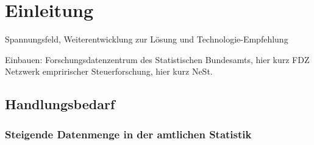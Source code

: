 \documentclass[
  german,
  10pt,
  twoside]{article}
\makeatletter
\newcommand{\berlintime}{%
  \berlinhr=\time\relax
  \divide\berlinhr by 60\relax
  \berlinmin=\time\relax
  \multiply\berlinhr by -60\relax
  \advance\berlinmin by \berlinhr\relax
  \berlinhr=\time\relax
  \divide\berlinhr by 60\relax
  \advance\berlinhr by 1\relax
  \ifnum\berlinhr>23\relax
    \advance\berlinhr by -24\relax
  \fi
  \ifnum\berlinhr<10 0\fi\the\berlinhr:\ifnum\berlinmin<10 0\fi\the\berlinmin%
}
\newif\ifdraftmode
\providecommand{\totalchars}{0}
\providecommand{\totalwords}{0}
\providecommand{\abstractchars}{0}
\providecommand{\abstractwords}{0}
\providecommand{\zusammenfassungchars}{0}
\providecommand{\zusammenfassungwords}{0}
\providecommand{\footnotecountnum}{0}
\providecommand{\citationcountnum}{0}
\newcommand{\doctitle}{$title$}
\newcommand{\docauthors}{$author-short$}
\newcommand{\docpublication}{$publication$}
\newcommand{\docpublicationissue}{$publication-issue$}
\newcommand{\metadatapage}{%
  \clearpage
  \thispagestyle{empty}
  \onecolumn
  \vspace*{1.5cm}
  
  {\raggedright
  {\LARGE\bfseries\color{wistaBlue} Dokument-Metadaten}\\[0.5cm]
  
  \begin{tabular}{@{}ll}
    \textbf{Titel:} & \doctitle \\[0.3em]
    \textbf{Autoren:} & \docauthors \\[0.3em]
    \textbf{Veröffentlichung:} & \docpublication\ \docpublicationissue \\[0.3em]
    \textbf{Erstellungsdatum:} & \today\ um \berlintime\ Uhr \\[0.3em]
  \end{tabular}
  
  \vspace{0.5cm}
  {\color{wistaBlue}\rule{\textwidth}{1pt}}
  \par}
  
  \vspace{1cm}
  
  {\large\bfseries\color{wistaDarkGray} Dokumentstatistik}\\[0.5cm]
  
  \small
  \begin{tabular}{@{}lrrrrrr@{}}
    \toprule
    \textbf{Abschnitt} & \textbf{Wörter} & \textbf{Zeichen} & \textbf{Fußn.} & \textbf{Quellen} & \textbf{Vorgabe} \\
    \midrule
    Insgesamt & \textcolor{wistaBlue}{\textbf{\totalwords}} & \textcolor{wistaBlue}{\textbf{\totalchars}} & \textcolor{wistaBlue}{\textbf{\footnotecountnum}} & \textcolor{wistaBlue}{\textbf{\citationcountnum}} & 30\,000 Z. \\
    Zusammenfassung & \textcolor{wistaBlue}{\textbf{\zusammenfassungwords}} & \textcolor{wistaBlue}{\textbf{\zusammenfassungchars}} & --- & --- & 800 Z. \\
    Abstract & \textcolor{wistaBlue}{\textbf{\abstractwords}} & \textcolor{wistaBlue}{\textbf{\abstractchars}} & --- & --- & 700 Z. \\
    \midrule
    \sectionrows
    \bottomrule
  \end{tabular}
  \normalsize
  
  \vspace{0.5cm}
  
  {\large\bfseries\color{wistaDarkGray} Schlüsselwörter}\\[0.3cm]
  \small
  \schlusselworterlist
  \normalsize
  
  \vspace{0.5cm}
  
  {\large\bfseries\color{wistaDarkGray} Keywords}\\[0.3cm]
  \small
  \keywordslist
  \normalsize
  
  \vspace{1cm}
  
  {\large\bfseries\color{wistaDarkGray} Tabellen}\\[0.3cm]
  
  \small
  \begin{tabular}{@{}lp{12cm}@{}}
    \toprule
    \textbf{Nr.} & \textbf{Beschreibung} \\
    \midrule
    \tablerows
    \bottomrule
  \end{tabular}
  \normalsize
  
  \vspace{1cm}
  
  {\large\bfseries\color{wistaDarkGray} Abbildungen}\\[0.3cm]
  
  \small
  \begin{tabular}{@{}lp{12cm}@{}}
    \toprule
    \textbf{Nr.} & \textbf{Beschreibung} \\
    \midrule
    \figurerows
    \bottomrule
  \end{tabular}
  \normalsize
  
  \clearpage
}
\makeatother
\begin{document}
\newcommand{\tablerows}{            \hyperref[tbl-pkg-versions]{Tabelle~1} & Versionen verfügbarer R-Packages \\
            \hyperref[tbl-baseline]{Tabelle~2} & Baselines in SAS und Stata (anhand 1\% des simuliertes BTP) \\
            \hyperref[tbl-benchmark-small]{Tabelle~3} & Performanz Messungen für die Fallzahlberechnung anhand 1\% des BTP \\
            \hyperref[tbl-benchmark-regr-small]{Tabelle~4} & Performanz Messungen für die Regressionsberechnung anhand 1\% des BTP \\
            \hyperref[tbl-benchmark]{Tabelle~5} & Performanz Messungen für die Fallzahlberechnung anhand 10\% des BTP \\
            \hyperref[tbl-benchmark-regr]{Tabelle~6} & Performanz Messungen für die Regressionsberechnung anhand 10\% des BTP \\
            \hyperref[tbl-bm-cnt-small]{Tabelle~7} & Benchmarkergebnisse für Fallzahlen (kleine Stichproben des BTP) \\
            \hyperref[tbl-bm-reg-small]{Tabelle~8} & Benchmarkergebnisse für Regression (kleine Stichproben des BTP) \\
}
\newcommand{\figurerows}{            \hyperref[fig-optimization-strategies]{Abbildung~1} & Strategien zur Performanz-Optimierung im FDZ-Bund \\
}
\newcommand{\schlusselworterlist}{}
\newcommand{\keywordslist}{}
\ifdraftmode
\metadatapage
\fi

\section{Einleitung}\label{sec-einleitung}

Spannungsfeld, Weiterentwicklung zur Lösung und Technologie-Empfehlung

Einbauen: Forschungsdatenzentrum des Statistischen Bundesamts, hier kurz
FDZ Netzwerk empririscher Steuerforschung, hier kurz NeSt.

\subsection{Handlungsbedarf}\label{handlungsbedarf}

\subsubsection{Steigende Datenmenge in der amtlichen
Statistik}\label{steigende-datenmenge-in-der-amtlichen-statistik}
\end{document}
